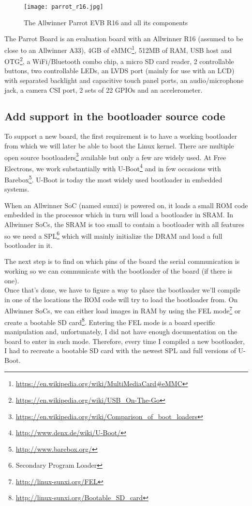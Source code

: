 \begin{figure}[H]
  \texttt{[image: parrot\_r16.jpg]}
  \caption{The Allwinner Parrot EVB R16 and all its components}
\end{figure}

The Parrot Board is an evaluation board with an Allwinner R16 (assumed to be close to an Allwinner A33), 4GB of eMMC\footnote{\url{https://en.wikipedia.org/wiki/MultiMediaCard\#eMMC}}, 512MB of RAM, USB host and OTG\footnote{\url{https://en.wikipedia.org/wiki/USB\_On-The-Go}}, a WiFi/Bluetooth combo chip, a micro SD card reader, 2 controllable buttons, two controllable LEDs, an LVDS port (mainly for use with an LCD) with separated backlight and capacitive touch panel ports, an audio/microphone jack, a camera CSI port, 2 sets of 22 GPIOs and an accelerometer.

\subsection{Add support in the bootloader source code}
To support a new board, the first requirement is to have a working bootloader from which we will later be able to boot the Linux kernel. There are multiple open source bootloaders\footnote{\url{https://en.wikipedia.org/wiki/Comparison\_of\_boot\_loaders}} available but only a few are widely used. At Free Electrons, we work substantially with U-Boot\footnote{\url{http://www.denx.de/wiki/U-Boot/}} and in few occasions with Barebox\footnote{\url{http://www.barebox.org/}}. U-Boot is today the most widely used bootloader in embedded systems.

When an Allwinner SoC (named sunxi) is powered on, it loads a small ROM code embedded in the processor which in turn will load a bootloader in SRAM. In Allwinner SoCs, the SRAM is too small to contain a bootloader with all features so we need a SPL\footnote{Secondary Program Loader} which will mainly initialize the DRAM and load a full bootloader in it.

The next step is to find on which pins of the board the serial communication is working so we can communicate with the bootloader of the board (if there is one).\\
Once that's done, we have to figure a way to place the bootloader we'll compile in one of the locations the ROM code will try to load the bootloader from. On Allwinner SoCs, we can either load images in RAM by using the FEL mode\footnote{\url{http://linux-sunxi.org/FEL}} or create a bootable SD card\footnote{\url{http://linux-sunxi.org/Bootable\_SD\_card}}. Entering the FEL mode is a board specific manipulation and, unfortunately, I did not have enough documentation on the board to enter in such mode. Therefore, every time I compiled a new bootloader, I had to recreate a bootable SD card with the newest SPL and full versions of U-Boot.

